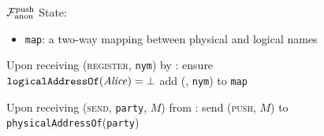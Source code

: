   \begin{figure}[H]
    \begin{systembox}{$\mathcal{F}_{\mathrm{anon}}^{\mathrm{push}}$}
      State:
      \begin{itemize}
        \item \texttt{map}: a two-way mapping between physical and logical names
      \end{itemize}
      \begin{algorithmic}[1]
        \State Upon receiving (\textsc{register}, \texttt{nym}) by \alice:
        \Indent
          \State ensure $\mathtt{logicalAddressOf}(\mathit{Alice}) = \bot$
          \State add (\alice, \texttt{nym}) to \texttt{map}
        \EndIndent
        \Statex

        \State Upon receiving (\textsc{send}, \texttt{party}, $M$) from \alice:
        \Indent
          \State send (\textsc{push}, $M$) to
          \texttt{physicalAddressOf}(\texttt{party}) 
        \EndIndent
        \Statex
      \end{algorithmic}
    \end{systembox}
    \caption{}
    \label{alg:fanon:push}
  \end{figure}
